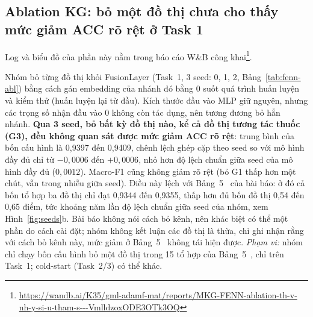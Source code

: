 \documentclass[conference]{IEEEtran}
\newcommand{\hlg}[1]{{\sethlcolor{hlgreen}\hl{#1}}}
\renewcommand{\hl}[1]{#1}
\begin{document}
\subsection{Ablation KG: \texorpdfstring{\hlg{bỏ một đồ thị chưa cho thấy mức giảm ACC rõ rệt ở Task 1}}{bỏ một đồ thị chưa cho thấy mức giảm ACC rõ rệt ở Task 1}}
\noindent Log và biểu đồ của phần này nằm trong báo cáo W\&B công khai\footnote{\url{https://wandb.ai/K35/gml-adamf-mat/reports/MKG-FENN-ablation-th-v-nh-y-si-u-tham-s---VmlldzoxODE3OTk3OQ}}.

Nhóm bỏ từng đồ thị khỏi FusionLayer (Task~1, 3 seed: 0, 1, 2, Bảng~\ref{tab:fenn-abl}) bằng cách
gán embedding của nhánh đó bằng $0$ suốt quá trình huấn luyện và kiểm thử (huấn luyện lại từ đầu). Kích thước đầu vào MLP giữ nguyên, nhưng các trọng số
nhận đầu vào $0$ không còn tác dụng, nên tương đương bỏ hẳn nhánh. \textbf{Qua 3 seed, bỏ bất kỳ đồ
thị nào, kể cả đồ thị tương tác thuốc (G3), đều \hlg{không quan sát được mức giảm ACC rõ rệt}}: trung bình của bốn cấu hình là
0,9397 đến 0,9409, chênh lệch ghép cặp theo seed so với mô hình đầy đủ chỉ từ $-0{,}0006$ đến
$+0{,}0006$, nhỏ hơn độ lệch chuẩn giữa seed của mô hình đầy đủ ($0{,}0012$). Macro-F1 cũng \hlg{không giảm rõ rệt (bỏ G1 thấp hơn một chút, vẫn trong nhiễu giữa seed)}.
Điều này lệch với Bảng~5~\cite{mkgfenn} của bài báo: ở đó cả bốn tổ hợp ba đồ thị chỉ đạt 0,9344 đến
0,9355, thấp hơn đủ bốn đồ thị 0,54 đến 0,65 điểm, tức khoảng năm lần độ lệch chuẩn giữa seed của nhóm,
xem Hình~\ref{fig:seeds}b. Bài báo không nói cách bỏ kênh, nên khác biệt có thể một phần do cách cài
đặt; nhóm không kết luận các đồ thị là thừa, chỉ ghi nhận rằng với cách bỏ kênh này, mức giảm ở
Bảng~5~\cite{mkgfenn} không tái hiện được. \emph{Phạm vi:} nhóm chỉ chạy bốn cấu hình bỏ một đồ thị trong
15 tổ hợp của Bảng~5~\cite{mkgfenn}, chỉ trên Task~1; cold-start (Task~2/3) có thể khác.
\end{document}
